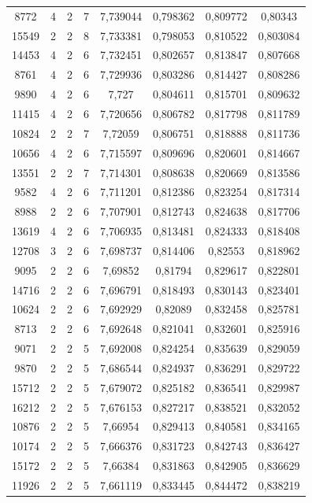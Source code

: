 \begin{longtable}{|c|c|c|c|c|c|c|c|}
8772 & 4 & 2 & 7 & 7,739044 & 0,798362 & 0,809772 & 0,80343 \\
15549 & 2 & 2 & 8 & 7,733381 & 0,798053 & 0,810522 & 0,803084 \\
14453 & 4 & 2 & 6 & 7,732451 & 0,802657 & 0,813847 & 0,807668 \\
8761 & 4 & 2 & 6 & 7,729936 & 0,803286 & 0,814427 & 0,808286 \\
9890 & 4 & 2 & 6 & 7,727 & 0,804611 & 0,815701 & 0,809632 \\
11415 & 4 & 2 & 6 & 7,720656 & 0,806782 & 0,817798 & 0,811789 \\
10824 & 2 & 2 & 7 & 7,72059 & 0,806751 & 0,818888 & 0,811736 \\
10656 & 4 & 2 & 6 & 7,715597 & 0,809696 & 0,820601 & 0,814667 \\
13551 & 2 & 2 & 7 & 7,714301 & 0,808638 & 0,820669 & 0,813586 \\
9582 & 4 & 2 & 6 & 7,711201 & 0,812386 & 0,823254 & 0,817314 \\
8988 & 2 & 2 & 6 & 7,707901 & 0,812743 & 0,824638 & 0,817706 \\
13619 & 4 & 2 & 6 & 7,706935 & 0,813481 & 0,824333 & 0,818408 \\
12708 & 3 & 2 & 6 & 7,698737 & 0,814406 & 0,82553 & 0,818962 \\
9095 & 2 & 2 & 6 & 7,69852 & 0,81794 & 0,829617 & 0,822801 \\
14716 & 2 & 2 & 6 & 7,696791 & 0,818493 & 0,830143 & 0,823401 \\
10624 & 2 & 2 & 6 & 7,692929 & 0,82089 & 0,832458 & 0,825781 \\
8713 & 2 & 2 & 6 & 7,692648 & 0,821041 & 0,832601 & 0,825916 \\
9071 & 2 & 2 & 5 & 7,692008 & 0,824254 & 0,835639 & 0,829059 \\
9870 & 2 & 2 & 5 & 7,686544 & 0,824937 & 0,836291 & 0,829722 \\
15712 & 2 & 2 & 5 & 7,679072 & 0,825182 & 0,836541 & 0,829987 \\
16212 & 2 & 2 & 5 & 7,676153 & 0,827217 & 0,838521 & 0,832052 \\
10876 & 2 & 2 & 5 & 7,66954 & 0,829413 & 0,840581 & 0,834165 \\
10174 & 2 & 2 & 5 & 7,666376 & 0,831723 & 0,842743 & 0,836427 \\
15172 & 2 & 2 & 5 & 7,66384 & 0,831863 & 0,842905 & 0,836629 \\
11926 & 2 & 2 & 5 & 7,661119 & 0,833445 & 0,844472 & 0,838219 \\

\end{longtable}
